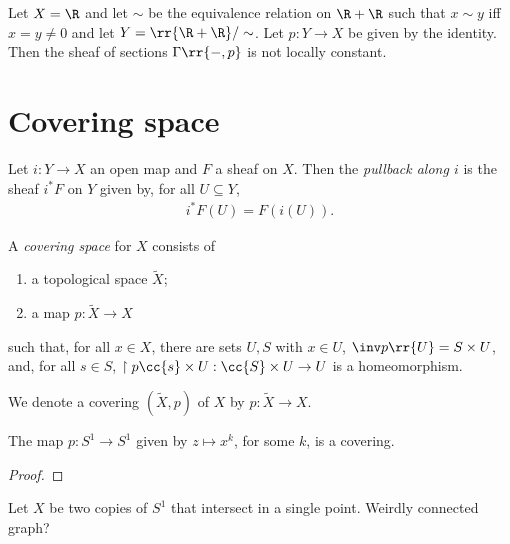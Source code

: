 \documentclass{article}
\begin{document}
\begin{example}
  Let $X=\R$ and let $\sim$ be the equivalence relation on $\R+\R$ such that
  $x\sim y$ iff $x=y\neq 0$ and let $Y=\rr{\R+\R}/\sim$. Let $p:Y\to X$ be
  given by the identity. Then the sheaf of sections $\Gamma\rr{-,p}$
  is not locally constant.
\end{example}

\section{Covering space}\label{sec:covering_space}

\begin{definition}
  Let $i:Y\to X$ an open map and $F$ a sheaf on $X$. Then
  the \emph{pullback along $i$} is the sheaf $i^*F$ on $Y$
  given by, for all $U\subseteq Y$,
  \begin{align*}
    i^*F(U) = F(i(U)).
  \end{align*}
\end{definition}



\begin{definition}
  A \emph{covering space} for $X$ consists of
  \begin{enumerate}
    \item a topological space $\tilde X$;
    \item a map $p:\tilde X\to X$
  \end{enumerate}
  such that, for all $x\in X$, there are sets $U,S$ with $x\in U$, $\inv p\rr{U}=S\times U$,
  and, for all $s\in S$, $\restriction{p}{\cc{s}\times U}:\cc{S}\times U\to U$ is a
  homeomorphism.
\end{definition}

\begin{notation}
  We denote a covering $(\tilde X,p)$ of $X$ by $p:\tilde X\to X$.
\end{notation}

\begin{example}
  The map $p:S^1\to S^1$ given by $z\mapsto x^k$, for some $k$, is a covering.
  \begin{proof}
    \missingproof
  \end{proof}
\end{example}

\begin{example}
  Let $X$ be two copies of $S^1$ that intersect in a single point. Weirdly connected
  graph?
\end{example}
\end{document}
